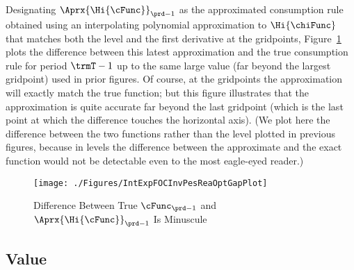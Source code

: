 \documentclass[\econtexRoot/SolvingMicroDSOPs]{subfiles}
\begin{document}
Designating $\Aprx{\Hi{\cFunc}}_{\prd-1}$ as the approximated consumption rule obtained using an interpolating polynomial approximation to $\Hi{\chiFunc}$ that matches both the level and the first derivative at the gridpoints, Figure~\ref{fig:IntExpFOCInvPesReaOptGapPlot} plots the difference between this latest approximation and the true consumption rule for period $\trmT-1$ up to the same large value (far beyond the largest gridpoint) used in prior figures.  Of course, at the gridpoints the approximation will exactly match the true function; but this figure illustrates that the approximation is quite accurate far beyond the last gridpoint (which is the last point at which the difference touches the horizontal axis).  (We plot here the difference between the two functions rather than the level plotted in previous figures, because in levels the difference between the approximate and the exact function would not be detectable even to the most eagle-eyed reader.)



\hypertarget{IntExpFOCInvPesReaOptGapPlot}{}
\begin{figure}
  \texttt{[image: ./Figures/IntExpFOCInvPesReaOptGapPlot]}
  \caption{Difference Between True $\cFunc_{\prd-1}$ and $\Aprx{\Hi{\cFunc}}_{\prd-1}$ Is Minuscule}
  \label{fig:IntExpFOCInvPesReaOptGapPlot}
\end{figure}




\hypertarget{value}{}
\subsection{Value}
\end{document}
